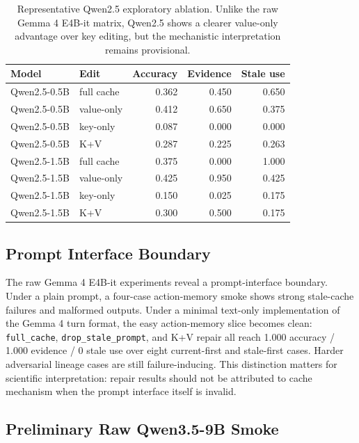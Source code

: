 \documentclass[11pt]{article}
\newcommand{\fullcache}{\texttt{full\_cache}}
\newcommand{\promptdelete}{\texttt{drop\_stale\_prompt}}
\newcommand{\gemma}{Gemma 4 E4B-it}
\begin{document}
\begin{table}[H]
\centering
\small
\begin{tabular}{llrrr}
\toprule
\textbf{Model} & \textbf{Edit} & \textbf{Accuracy} & \textbf{Evidence} & \textbf{Stale use} \\
\midrule
Qwen2.5-0.5B & full cache & 0.362 & 0.450 & 0.650 \\
Qwen2.5-0.5B & value-only & 0.412 & 0.650 & 0.375 \\
Qwen2.5-0.5B & key-only & 0.087 & 0.000 & 0.000 \\
Qwen2.5-0.5B & K+V & 0.287 & 0.225 & 0.263 \\
\midrule
Qwen2.5-1.5B & full cache & 0.375 & 0.000 & 1.000 \\
Qwen2.5-1.5B & value-only & 0.425 & 0.950 & 0.425 \\
Qwen2.5-1.5B & key-only & 0.150 & 0.025 & 0.175 \\
Qwen2.5-1.5B & K+V & 0.300 & 0.500 & 0.175 \\
\bottomrule
\end{tabular}
\caption{Representative Qwen2.5 exploratory ablation. Unlike the raw \gemma{}
matrix, Qwen2.5 shows a clearer value-only advantage over key editing, but the
mechanistic interpretation remains provisional.}
\label{tab:qwen-ablation}
\end{table}

\subsection{Prompt Interface Boundary}

The raw \gemma{} experiments reveal a prompt-interface boundary. Under a plain
prompt, a four-case action-memory smoke shows strong stale-cache failures and
malformed outputs. Under a minimal text-only implementation of the Gemma 4 turn
format, the easy action-memory slice becomes clean: \fullcache{},
\promptdelete{}, and K+V repair all reach 1.000 accuracy / 1.000 evidence /
0 stale use over eight current-first and stale-first cases. Harder adversarial
lineage cases are still failure-inducing. This distinction matters for
scientific interpretation: repair results should not be attributed to cache
mechanism when the prompt interface itself is invalid.

\subsection{Preliminary Raw Qwen3.5-9B Smoke}
\end{document}
